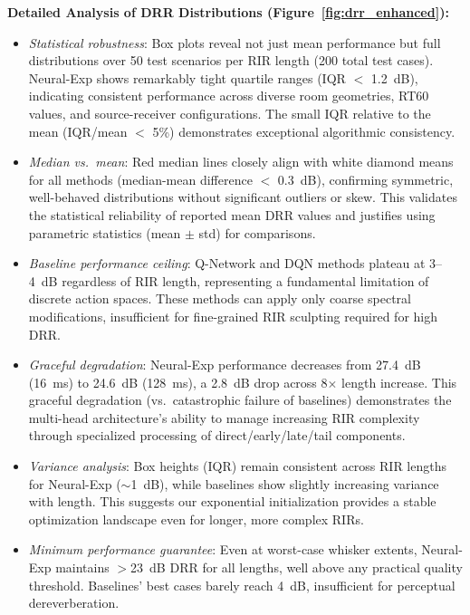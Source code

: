 \documentclass[12pt,a4paper]{article}
\begin{document}
\textbf{Detailed Analysis of DRR Distributions (Figure~\ref{fig:drr_enhanced}):}
\begin{itemize}
\item \textit{Statistical robustness}: Box plots reveal not just mean performance but full distributions over 50 test scenarios per RIR length (200 total test cases). Neural-Exp shows remarkably tight quartile ranges (IQR $<$ 1.2~dB), indicating consistent performance across diverse room geometries, RT60 values, and source-receiver configurations. The small IQR relative to the mean (IQR/mean $<$ 5\%) demonstrates exceptional algorithmic consistency.

\item \textit{Median vs.\ mean}: Red median lines closely align with white diamond means for all methods (median-mean difference $<$ 0.3~dB), confirming symmetric, well-behaved distributions without significant outliers or skew. This validates the statistical reliability of reported mean DRR values and justifies using parametric statistics (mean $\pm$ std) for comparisons.

\item \textit{Baseline performance ceiling}: Q-Network and DQN methods plateau at 3--4~dB regardless of RIR length, representing a fundamental limitation of discrete action spaces. These methods can apply only coarse spectral modifications, insufficient for fine-grained RIR sculpting required for high DRR.

\item \textit{Graceful degradation}: Neural-Exp performance decreases from 27.4~dB (16~ms) to 24.6~dB (128~ms), a 2.8~dB drop across 8$\times$ length increase. This graceful degradation (vs.\ catastrophic failure of baselines) demonstrates the multi-head architecture's ability to manage increasing RIR complexity through specialized processing of direct/early/late/tail components.

\item \textit{Variance analysis}: Box heights (IQR) remain consistent across RIR lengths for Neural-Exp ($\sim$1~dB), while baselines show slightly increasing variance with length. This suggests our exponential initialization provides a stable optimization landscape even for longer, more complex RIRs.

\item \textit{Minimum performance guarantee}: Even at worst-case whisker extents, Neural-Exp maintains $>$23~dB DRR for all lengths, well above any practical quality threshold. Baselines' best cases barely reach 4~dB, insufficient for perceptual dereverberation.
\end{itemize}
\end{document}

